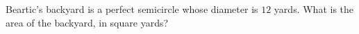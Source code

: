 Beartic's backyard is a perfect semicircle whose diameter is $12$ yards. What is the area of the backyard, in square yards?
